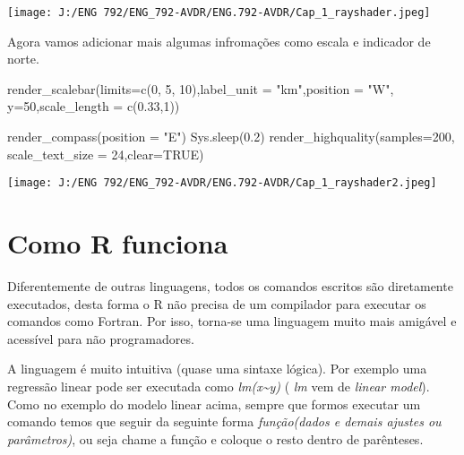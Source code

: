 \documentclass[
]{book}
\newenvironment{Shaded}{\begin{snugshade}}{\end{snugshade}}
\newcommand{\AttributeTok}[1]{\textcolor[rgb]{0.77,0.63,0.00}{#1}}
\newcommand{\ConstantTok}[1]{\textcolor[rgb]{0.00,0.00,0.00}{#1}}
\newcommand{\DecValTok}[1]{\textcolor[rgb]{0.00,0.00,0.81}{#1}}
\newcommand{\FloatTok}[1]{\textcolor[rgb]{0.00,0.00,0.81}{#1}}
\newcommand{\FunctionTok}[1]{\textcolor[rgb]{0.00,0.00,0.00}{#1}}
\newcommand{\NormalTok}[1]{#1}
\newcommand{\StringTok}[1]{\textcolor[rgb]{0.31,0.60,0.02}{#1}}
\begin{document}
\texttt{[image: J:/ENG 792/ENG\_792-AVDR/ENG.792-AVDR/Cap\_1\_rayshader.jpeg]}

Agora vamos adicionar mais algumas infromações como escala e indicador de norte.

\begin{Shaded}
\begin{Highlighting}[]
\FunctionTok{render\_scalebar}\NormalTok{(}\AttributeTok{limits=}\FunctionTok{c}\NormalTok{(}\DecValTok{0}\NormalTok{, }\DecValTok{5}\NormalTok{, }\DecValTok{10}\NormalTok{),}\AttributeTok{label\_unit =} \StringTok{"km"}\NormalTok{,}\AttributeTok{position =} \StringTok{"W"}\NormalTok{, }\AttributeTok{y=}\DecValTok{50}\NormalTok{,}\AttributeTok{scale\_length =} \FunctionTok{c}\NormalTok{(}\FloatTok{0.33}\NormalTok{,}\DecValTok{1}\NormalTok{))}

\FunctionTok{render\_compass}\NormalTok{(}\AttributeTok{position =} \StringTok{"E"}\NormalTok{)}
\FunctionTok{Sys.sleep}\NormalTok{(}\FloatTok{0.2}\NormalTok{)}
\FunctionTok{render\_highquality}\NormalTok{(}\AttributeTok{samples=}\DecValTok{200}\NormalTok{, }\AttributeTok{scale\_text\_size =} \DecValTok{24}\NormalTok{,}\AttributeTok{clear=}\ConstantTok{TRUE}\NormalTok{)}
\end{Highlighting}
\end{Shaded}

\texttt{[image: J:/ENG 792/ENG\_792-AVDR/ENG.792-AVDR/Cap\_1\_rayshader2.jpeg]}

\hypertarget{como-r-funciona}{%
\section{Como R funciona}\label{como-r-funciona}}

Diferentemente de outras linguagens, todos os comandos escritos são diretamente executados, desta forma o R não precisa de um compilador para executar os comandos como Fortran. Por isso, torna-se uma linguagem muito mais amigável e acessível para não programadores.

A linguagem é muito intuitiva (quase uma sintaxe lógica). Por exemplo uma regressão linear pode ser executada como \emph{lm(x\textasciitilde y)} ( \emph{\emph{lm}} vem de \emph{\emph{linear model}}). Como no exemplo do modelo linear acima, sempre que formos executar um comando temos que seguir da seguinte forma \emph{\emph{função(dados e demais ajustes ou parâmetros)}}, ou seja chame a função e coloque o resto dentro de parênteses.
\end{document}
